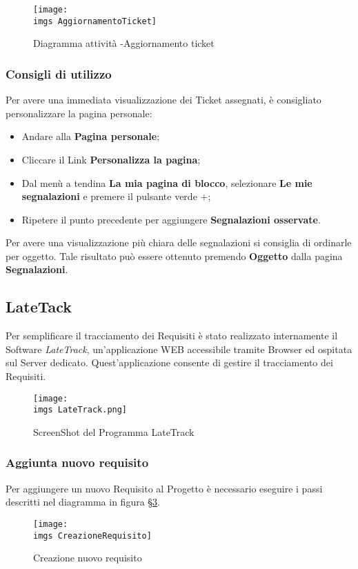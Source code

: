 \begin{figure}[H]
  \centering
    \texttt{[image: \\imgs AggiornamentoTicket]}
  \caption{Diagramma attività -Aggiornamento ticket}
  \label{fig:gull}
\end{figure}




\subsubsection{Consigli di utilizzo}
 
	Per avere una immediata visualizzazione dei Ticket assegnati, è consigliato personalizzare 
	la pagina personale: 
	\begin{itemize}
		\item Andare alla \textbf{Pagina personale}; 
		\item Cliccare il Link \textbf{Personalizza la pagina}; 
		\item Dal menù a tendina \textbf{La mia pagina di blocco}, selezionare \textbf{Le mie segnalazioni} 
		e premere il pulsante verde +; 
		\item Ripetere il punto precedente per aggiungere \textbf{Segnalazioni osservate}. 
	
	\end{itemize}

	Per avere una visualizzazione più chiara delle segnalazioni si consiglia di ordinarle per 
	oggetto. Tale risultato può essere ottenuto premendo \textbf{Oggetto} dalla pagina \textbf{Segnalazioni}.

\subsection{LateTack}
\label{sec:lateTrack}
Per semplificare il tracciamento dei Requisiti è stato realizzato internamente il Software
\emph{LateTrack}, un’applicazione WEB accessibile tramite Browser ed ospitata sul Server dedicato.
Quest’applicazione consente di gestire il tracciamento dei Requisiti.

\begin{figure}[H]
	\centering
\texttt{[image: \\imgs LateTrack.png]}
  \caption{ScreenShot del Programma LateTrack}
  \label{fig:lateTrack}
\end{figure}
\subsubsection{Aggiunta nuovo requisito}
Per aggiungere un nuovo Requisito al Progetto è necessario eseguire i passi descritti nel
diagramma in figura \S\ref{fig:CreazioneRequisito}.
\begin{figure}
	\centering
	\texttt{[image: \\imgs CreazioneRequisito]}
 	 \caption{Creazione nuovo requisito}
  	\label{fig:CreazioneRequisito}
\end{figure}